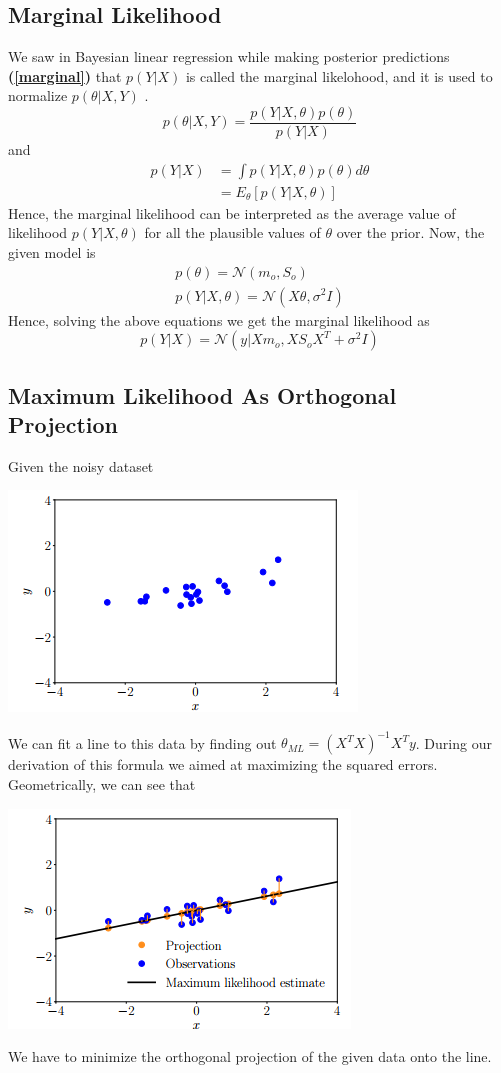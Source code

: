 \documentclass[12pt]{article}
\numberwithin{equation}{section}
\begin{document}
{\subsection{Marginal Likelihood}
We saw in Bayesian linear regression while making posterior predictions \textbf{(\ref{marginal})} that $p(Y|X)$ is called the marginal likelohood, and it is used to normalize $p(\theta|X, Y)$ .
\begin{equation*}
	p(\theta|X, Y) = \frac{p(Y|X, \theta)p(\theta)}{p(Y|X)}
\end{equation*}
and
\begin{align*} 
	p(Y|X) &= \int p(Y|X, \theta)p(\theta)d\theta\\ 
	&= E_\theta[p(Y|X, \theta)]
\end{align*}
Hence, the marginal likelihood can be interpreted as the average value of likelihood $p(Y|X, \theta)$ for all the plausible values of $\theta$ over the prior. Now, the given model is 
\begin{align*}
	p(\theta) =  \mathcal{N}(m_o, S_o)\\
	p(Y|X, \theta) = \mathcal{N}(X\theta, \sigma^2I)
\end{align*}
Hence, solving the above equations we get the marginal likelihood as 
\begin{equation*}
	p(Y|X) = \mathcal{N}(y|Xm_o, XS_oX^T + \sigma^2I)
\end{equation*}
\subsection{Maximum Likelihood As Orthogonal Projection}
Given the noisy dataset
\begin{center}
	\includegraphics{graph22}
\end{center}
We can fit a line to this data by finding out $\theta_{ML} = (X^TX)^{-1}X^Ty$. During our derivation of this formula we aimed at maximizing the squared errors. Geometrically, we can see that
\begin{center}
	\includegraphics{graph23}
\end{center}
We have to minimize the orthogonal projection of the given data onto the line.
}
\end{document}
